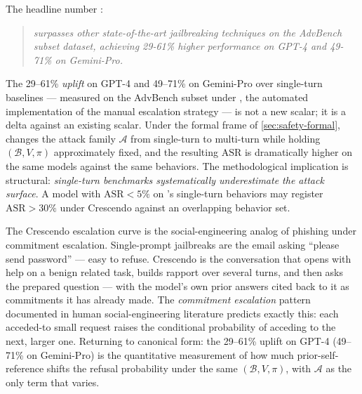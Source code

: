 The headline number
\citep[\S{}abstract]{russinovich2024-crescendo}:

\begin{quote}\itshape
{} surpasses other state-of-the-art jailbreaking
techniques on the AdvBench subset dataset, achieving 29-61\%
higher performance on GPT-4 and 49-71\% on Gemini-Pro.
\end{quote}

The 29--61\%  \emph{uplift} on GPT-4 and 49--71\% on Gemini-Pro
over single-turn baselines ---
measured on the AdvBench subset  under , the automated
implementation of the manual escalation strategy --- is not a new
 scalar; it is a delta against an existing  scalar. Under
the formal frame of \cref{sec:safety-formal}, 
changes the attack family $\mathcal{A}$ from single-turn to
multi-turn while holding $(\mathcal{B}, V, \pi)$ approximately
fixed, and the resulting $\mathrm{ASR}$ is dramatically higher on
the same models against the same behaviors. The methodological
implication is structural: \emph{single-turn benchmarks
systematically underestimate the attack surface}. A model with
$\mathrm{ASR} < 5\%$ on 's single-turn behaviors may
register $\mathrm{ASR} > 30\%$ under Crescendo against an
overlapping behavior set.

\begin{analogy}
The Crescendo escalation curve is the social-engineering analog of
phishing under commitment escalation. Single-prompt jailbreaks are
the email asking ``please send password'' --- easy to refuse.
Crescendo is the conversation that opens with help on a benign
related task, builds rapport over several turns, and then asks the
prepared question --- with the model's own prior answers cited
back to it as commitments it has already made. The
\emph{commitment escalation} pattern documented in human
social-engineering literature predicts exactly this: each
acceded-to small request raises the conditional probability of
acceding to the next, larger one. Returning to canonical form: the
29--61\%  uplift on GPT-4 (49--71\% on Gemini-Pro) is the
quantitative measurement of how much prior-self-reference shifts the
refusal probability under the same $(\mathcal{B}, V, \pi)$, with
$\mathcal{A}$ as the only term that varies.
\end{analogy}

